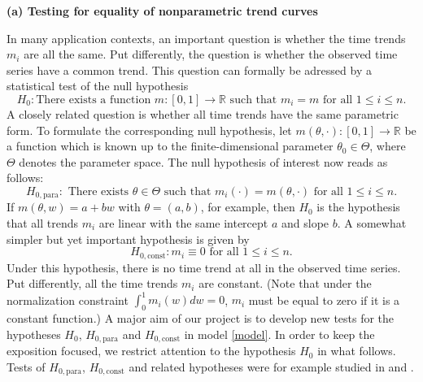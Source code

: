 \documentclass[a4paper,12pt]{article}
\begin{document}
\noindent \textbf{(a) Testing for equality of nonparametric trend curves } 
\vspace{10pt} 

 
\noindent In many application contexts, an important question is whether the time trends $m_i$ are all the same. Put differently, the question is whether the observed time series have a common trend. This question can formally be adressed by a statistical test of the null hypothesis 
\[ H_0: \text{There exists a function } m: [0,1] \rightarrow \mathbb{R} \text{ such that } m_i = m  \text{ for all } 1 \le i \le n. \]
A closely related question is whether all time trends have the same parametric form. To formulate the corresponding null hypothesis, let $m(\theta,\cdot): [0,1] \rightarrow \mathbb{R}$ be a function which is known up to the finite-dimensional parameter $\theta_0 \in \Theta$, where $\Theta$ denotes the parameter space. The null hypothesis of interest now reads as follows:  
\[ H_{0,\text{para}}: \text{ There exists } \theta \in \Theta \text{ such that } m_i(\cdot) = m(\theta,\cdot) \text{ for all } 1 \le i \le n. \]  
If $m(\theta,w) = a + b w$ with $\theta = (a,b)$, for example, then $H_0$ is the hypothesis that all trends $m_i$ are linear with the same intercept $a$ and slope $b$. A somewhat simpler but yet important hypothesis is given by 
\[ H_{0,\text{const}}: m_i \equiv 0 \text{ for all } 1 \le i \le n. \]
Under this hypothesis, there is no time trend at all in the observed time series. Put differently, all the time trends $m_i$ are constant. (Note that under the normalization constraint $\int_0^1 m_i(w) dw = 0$, $m_i$ must be equal to zero if it is a constant function.) A major aim of our project is to develop new tests for the hypotheses $H_0$, $H_{0,\text{para}}$ and $H_{0,\text{const}}$ in model \eqref{model}. In order to keep the exposition focused, we restrict attention to the hypothesis $H_0$ in what follows. Tests of $H_{0,\text{para}}$, $H_{0,\text{const}}$ and related hypotheses were for example studied in \cite{Lyubchich2016} and \cite{ChenWu2018}. 
\end{document}
